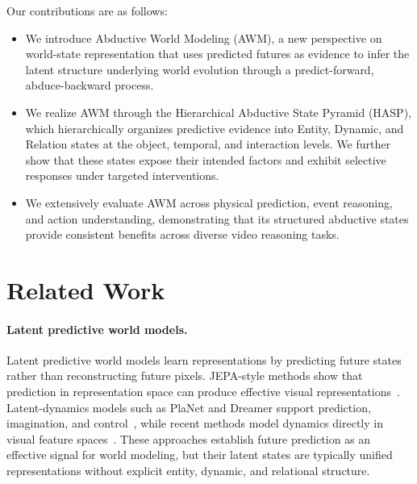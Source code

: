 \documentclass{article}
\newcommand{\vjepa}{V-JEPA~2}
\begin{document}
Our contributions are as follows:
\begin{itemize}
\item We introduce Abductive World Modeling (AWM), a new perspective on world-state representation that uses predicted futures as evidence to infer the latent structure underlying world evolution through a predict-forward, abduce-backward process.

\item We realize AWM through the Hierarchical Abductive State Pyramid (HASP), which hierarchically organizes predictive evidence into Entity, Dynamic, and Relation states at the object, temporal, and interaction levels. We further show that these states expose their intended factors and exhibit selective responses under targeted interventions.

\item We extensively evaluate AWM across physical prediction, event reasoning, and action understanding, demonstrating that its structured abductive states provide consistent benefits across diverse video reasoning tasks.

\end{itemize}


\section{Related Work}

\paragraph{Latent predictive world models.}

Latent predictive world models learn representations by predicting future states rather than reconstructing future pixels. JEPA-style methods show that prediction in representation space can produce effective visual representations~\citep{assran2023ijepa,bardes2024vjepa,assran2025vjepa2}. Latent-dynamics models such as PlaNet and Dreamer support prediction, imagination, and control~\citep{hafner2019planet,hafner2020dreamer,hafner2023dreamerv3}, while recent methods model dynamics directly in visual feature spaces~\citep{zhou2025dinowm,wang2026internvideonext}. These approaches establish future prediction as an effective signal for world modeling, but their latent states are typically unified representations without explicit entity, dynamic, and relational structure.
\end{document}

